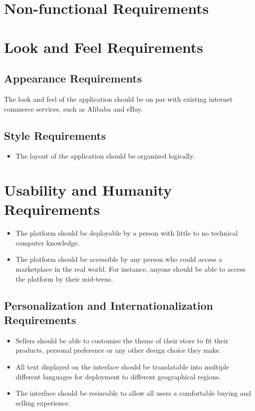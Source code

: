 \documentclass{article}
\begin{document}
\color{red}
\section*{Non-functional Requirements}
\section{Look and Feel Requirements}
\subsection{Appearance Requirements}
The look and feel of the application should be on par with existing internet commerce services, such as Alibaba and eBay. 
\subsection{Style Requirements}
\begin{itemize}
\item
The layout of the application should be organized logically.
\end{itemize}
\section{Usability and Humanity Requirements}
\begin{itemize}
\item
The platform should be deployable by a person with little to no technical computer knowledge.
\item
The platform should be accessible by any person who could access a marketplace in the real world. For instance, anyone should be able to access the platform by their mid-teens.
\end{itemize}
\subsection{Personalization and Internationalization Requirements}
\begin{itemize}
\item
Sellers should be able to customise the theme of their store to fit their products, personal preference or any other design choice they make. 
\item
All text displayed on the interface should be translatable into multiple different languages for deployment to different geographical regions.
\item
The interface should be resizeable to allow all users a comfortable buying and selling experience.
\end{itemize}
\end{document}
